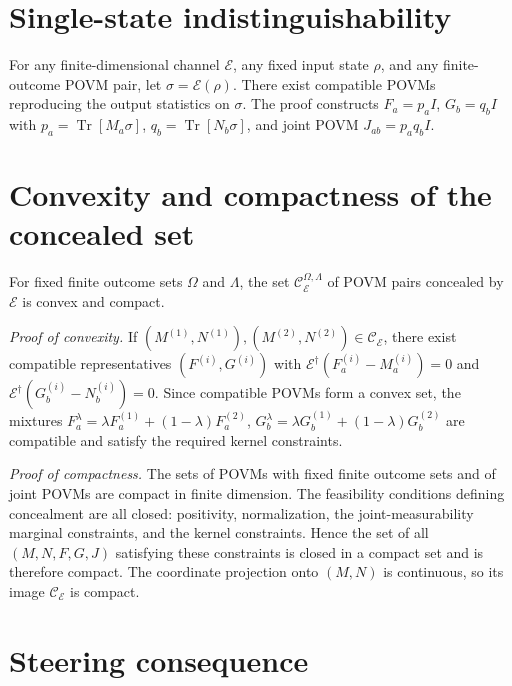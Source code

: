\documentclass[
aps,pra,twocolumn,10pt,
superscriptaddress,longbibliography,floatfix
]{revtex4-2}
\DeclareMathOperator{\Tr}{Tr}
\begin{document}
\appendix

\section{Single-state indistinguishability}
\label{app:single_state}

For any finite-dimensional channel $\mathcal E$, any fixed input state $\rho$, and any finite-outcome POVM pair, let $\sigma=\mathcal E(\rho)$. There exist compatible POVMs reproducing the output statistics on $\sigma$. The proof constructs $F_a=p_aI$, $G_b=q_bI$ with $p_a=\Tr[M_a\sigma]$, $q_b=\Tr[N_b\sigma]$, and joint POVM $J_{ab}=p_aq_bI$.

\section{Convexity and compactness of the concealed set}
\label{app:convexity_compactness}

For fixed finite outcome sets $\Omega$ and $\Lambda$, the set $\mathcal C_{\mathcal E}^{\Omega,\Lambda}$ of POVM pairs concealed by $\mathcal E$ is convex and compact.

\emph{Proof of convexity.} If $(M^{(1)},N^{(1)}), (M^{(2)},N^{(2)}) \in \mathcal C_{\mathcal E}$, there exist compatible representatives $(F^{(i)},G^{(i)})$ with $\mathcal E^\dagger(F_a^{(i)}-M_a^{(i)})=0$ and $\mathcal E^\dagger(G_b^{(i)}-N_b^{(i)})=0$. Since compatible POVMs form a convex set, the mixtures $F_a^\lambda = \lambda F_a^{(1)}+(1-\lambda)F_a^{(2)}$, $G_b^\lambda = \lambda G_b^{(1)}+(1-\lambda)G_b^{(2)}$ are compatible and satisfy the required kernel constraints.

\emph{Proof of compactness.} The sets of POVMs with fixed finite outcome sets and of joint POVMs are compact in finite dimension. The feasibility conditions defining concealment are all closed: positivity, normalization, the joint-measurability marginal constraints, and the kernel constraints. Hence the set of all $(M,N,F,G,J)$ satisfying these constraints is closed in a compact set and is therefore compact. The coordinate projection onto $(M,N)$ is continuous, so its image $\mathcal C_{\mathcal E}$ is compact.

\section{Steering consequence}
\label{app:steering}
\end{document}
